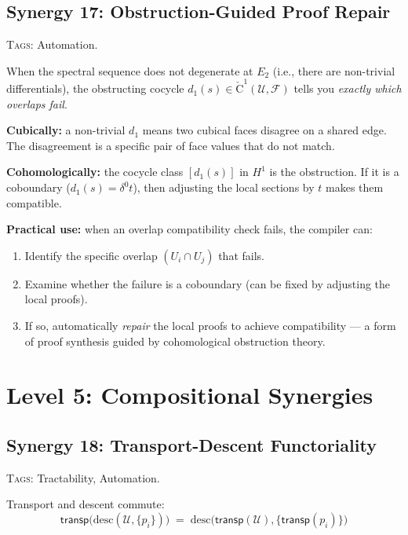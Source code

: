 \documentclass[11pt,a4paper]{article}
\theoremstyle{definition}
\theoremstyle{plain}
\newcommand{\Cech}{\check{\mathrm{C}}}
\newcommand{\covers}{\mathcal{U}}
\newcommand{\Hone}{H^1}
\newcommand{\presheaf}{\mathcal{F}}
\newcommand{\transp}{\mathsf{transp}}
\begin{document}
\subsection{Synergy 17: Obstruction-Guided Proof Repair}
\label{sec:syn-obstruction}

\textsc{Tags:} Automation.

\medskip\noindent
When the spectral sequence does not degenerate at $E_2$ (i.e.,
there are non-trivial differentials), the obstructing cocycle
$d_1(s) \in \Cech^1(\covers, \presheaf)$ tells you
\emph{exactly which overlaps fail}.

\textbf{Cubically:} a non-trivial $d_1$ means two cubical faces
disagree on a shared edge.  The disagreement is a specific pair
of face values that do not match.

\textbf{Cohomologically:} the cocycle class $[d_1(s)]$ in $\Hone$
is the obstruction.  If it is a coboundary ($d_1(s) = \delta^0 t$),
then adjusting the local sections by $t$ makes them compatible.

\textbf{Practical use:} when an overlap compatibility check fails,
the compiler can:
\begin{enumerate}
\item Identify the specific overlap $(U_i \cap U_j)$ that fails.
\item Examine whether the failure is a coboundary (can be fixed by
  adjusting the local proofs).
\item If so, automatically \emph{repair} the local proofs to achieve
  compatibility --- a form of proof synthesis guided by cohomological
  obstruction theory.
\end{enumerate}


\section{Level 5: Compositional Synergies}
\label{sec:syn-compositional}


\subsection{Synergy 18: Transport-Descent Functoriality}
\label{sec:syn-transp-descent}

\textsc{Tags:} Tractability, Automation.

\medskip\noindent
Transport and descent commute:
\[
  \transp\bigl(\mathrm{desc}(\covers, \{p_i\})\bigr)
  \;=\;
  \mathrm{desc}\bigl(\transp(\covers), \{\transp(p_i)\}\bigr)
\]
\end{document}
